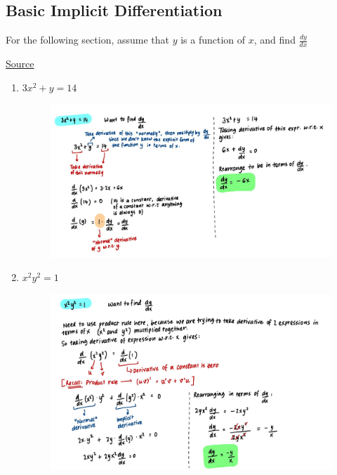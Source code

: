 \documentclass{article}
\begin{document}
\subsection*{Basic Implicit Differentiation}
For the following section, assume that $y$ is a function of $x$, and find $\frac{dy}{dx}$

\noindent \href{https://www.erhsnyc.org/ourpages/auto/2014/3/3/55800254/Implicit_differentiation_worksheet_with_answers.pdf}{Source}
\begin{enumerate}
    \item $3x^2 + y = 14$
    \begin{figure}[H]
        \centering
        \includegraphics[width=0.85 \linewidth]{Q1.jpg}
        \label{fig:Q1}
    \end{figure}

    \item $x^2y^2 = 1$
    \begin{figure}[H]
        \centering
        \includegraphics[width=0.85\linewidth]{Q2.jpg}
        \label{fig:Q2}
    \end{figure}


\end{enumerate}
\end{document}
